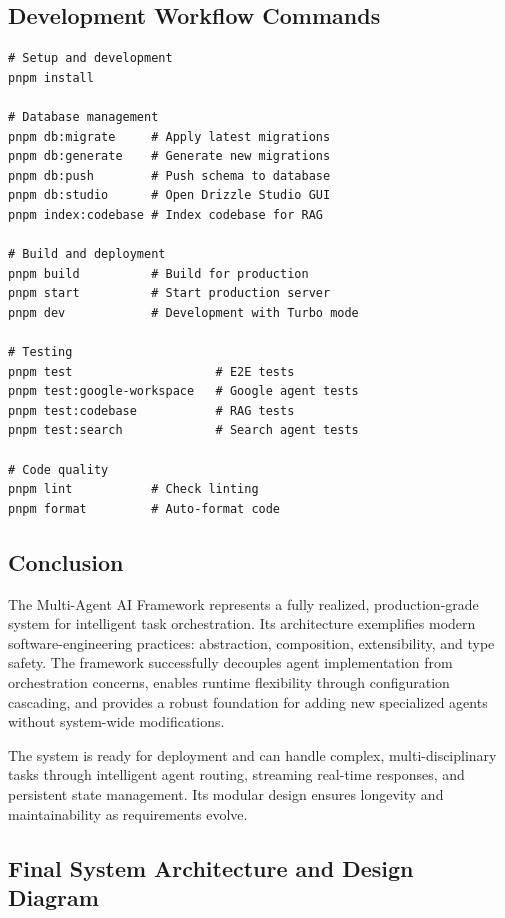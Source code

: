 \documentclass[11pt,a4paper]{report}
\begin{document}
\subsection{Development Workflow Commands}

\begin{lstlisting}[style=shstyle]
# Setup and development
pnpm install

# Database management
pnpm db:migrate     # Apply latest migrations
pnpm db:generate    # Generate new migrations
pnpm db:push        # Push schema to database
pnpm db:studio      # Open Drizzle Studio GUI
pnpm index:codebase # Index codebase for RAG

# Build and deployment
pnpm build          # Build for production
pnpm start          # Start production server
pnpm dev            # Development with Turbo mode

# Testing
pnpm test                    # E2E tests
pnpm test:google-workspace   # Google agent tests
pnpm test:codebase           # RAG tests
pnpm test:search             # Search agent tests

# Code quality
pnpm lint           # Check linting
pnpm format         # Auto-format code
\end{lstlisting}

\subsection{Conclusion}

The Multi-Agent AI Framework represents a fully realized, production-grade
system for intelligent task orchestration. Its architecture exemplifies
modern software-engineering practices: abstraction, composition,
extensibility, and type safety. The framework successfully decouples agent
implementation from orchestration concerns, enables runtime flexibility
through configuration cascading, and provides a robust foundation for adding
new specialized agents without system-wide modifications.

The system is ready for deployment and can handle complex, multi-disciplinary
tasks through intelligent agent routing, streaming real-time responses, and
persistent state management. Its modular design ensures longevity and
maintainability as requirements evolve.

\subsection{Final System Architecture and Design Diagram}
\end{document}

